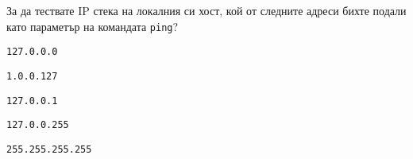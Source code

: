 \begin{q}
  За да тествате IP стека на локалния си хост, кой от следните адреси бихте
  подали като параметър на командата \texttt{ping}?
  \begin{defractors}
  \item \texttt{127.0.0.0}
  \item \texttt{1.0.0.127}
  \item \texttt{127.0.0.1}
  \item \texttt{127.0.0.255}
  \item \texttt{255.255.255.255}
  \end{defractors}
\end{q}